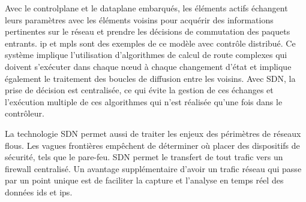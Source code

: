 Avec le \gls{controlplane} et le \gls{dataplane} embarqués, les éléments actifs échangent leurs paramètres avec les éléments voisins pour acquérir des informations pertinentes sur le réseau et prendre les décisions de commutation des paquets entrants. \gls{ip} et \gls{mpls} sont des exemples de ce modèle avec contrôle distribué. 
Ce système implique l'utilisation d'algorithmes de calcul de route complexes qui doivent s'exécuter dans chaque nœud à chaque changement d'état et implique également le traitement des boucles de diffusion entre les voisins. 
Avec SDN, la prise de décision est centralisée, ce qui évite la gestion de ces échanges et l'exécution multiple de ces algorithmes qui n'est réalisée qu'une fois dans le contrôleur. 



La technologie SDN permet aussi de traiter les enjeux des périmètres de réseaux flous. Les vagues frontières empêchent de déterminer où placer des dispositifs de sécurité, tels que le pare-feu. SDN permet le transfert de tout trafic vers un firewall centralisé. Un avantage supplémentaire d'avoir un trafic réseau qui passe par un point unique est de faciliter la capture et l'analyse en temps réel des données \gls{ids} et \gls{ips}. \cite{sdnbookControlDataPlanes}

